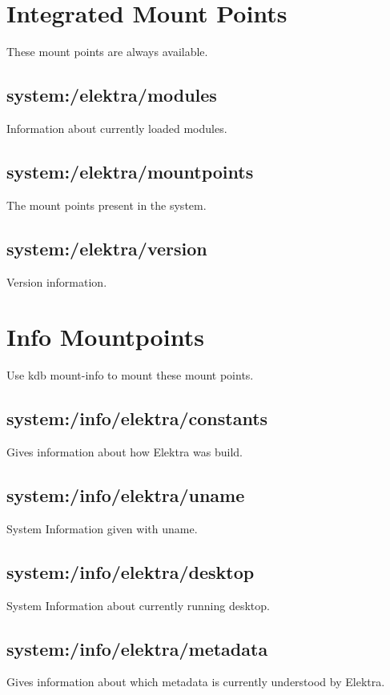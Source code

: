 \hypertarget{doc_help_elektra-hierarchy_md_autotoc_md2542}{}\section{Integrated Mount Points}\label{doc_help_elektra-hierarchy_md_autotoc_md2542}
These mount points are always available.\hypertarget{doc_help_elektra-hierarchy_md_autotoc_md2543}{}\subsection{system\+:/elektra/modules}\label{doc_help_elektra-hierarchy_md_autotoc_md2543}
Information about currently loaded modules.\hypertarget{doc_help_elektra-hierarchy_md_autotoc_md2544}{}\subsection{system\+:/elektra/mountpoints}\label{doc_help_elektra-hierarchy_md_autotoc_md2544}
The mount points present in the system.\hypertarget{doc_help_elektra-hierarchy_md_autotoc_md2545}{}\subsection{system\+:/elektra/version}\label{doc_help_elektra-hierarchy_md_autotoc_md2545}
Version information.\hypertarget{doc_help_elektra-hierarchy_md_autotoc_md2546}{}\section{Info Mountpoints}\label{doc_help_elektra-hierarchy_md_autotoc_md2546}
Use {\ttfamily kdb mount-\/info} to mount these mount points.\hypertarget{doc_help_elektra-hierarchy_md_autotoc_md2547}{}\subsection{system\+:/info/elektra/constants}\label{doc_help_elektra-hierarchy_md_autotoc_md2547}
Gives information about how Elektra was build.\hypertarget{doc_help_elektra-hierarchy_md_autotoc_md2548}{}\subsection{system\+:/info/elektra/uname}\label{doc_help_elektra-hierarchy_md_autotoc_md2548}
System Information given with {\ttfamily uname}.\hypertarget{doc_help_elektra-hierarchy_md_autotoc_md2549}{}\subsection{system\+:/info/elektra/desktop}\label{doc_help_elektra-hierarchy_md_autotoc_md2549}
System Information about currently running desktop.\hypertarget{doc_help_elektra-hierarchy_md_autotoc_md2550}{}\subsection{system\+:/info/elektra/metadata}\label{doc_help_elektra-hierarchy_md_autotoc_md2550}
Gives information about which metadata is currently understood by Elektra.

